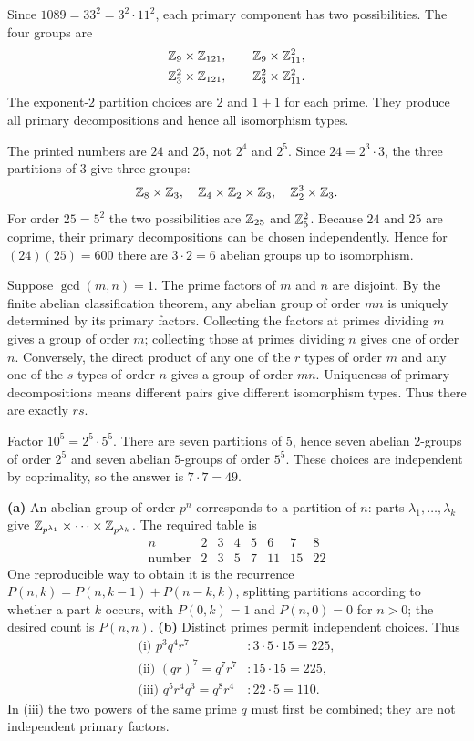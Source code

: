 Since $1089=33^2=3^2\cdot11^2$, each primary component has two possibilities. The four groups are
\[\begin{gathered}
\mathbb{Z}_9\times\mathbb{Z}_{121},\qquad\mathbb{Z}_9\times\mathbb{Z}_{11}^2,\\
\mathbb{Z}_3^2\times\mathbb{Z}_{121},\qquad\mathbb{Z}_3^2\times\mathbb{Z}_{11}^2.
\end{gathered}\]
The exponent-$2$ partition choices are $2$ and $1+1$ for each prime. They produce all primary decompositions and hence all isomorphism types.

The printed numbers are $24$ and $25$, not $2^4$ and $2^5$. Since $24=2^3\cdot3$, the three partitions of $3$ give three groups:
\[\mathbb{Z}_8\times\mathbb{Z}_3,\quad\mathbb{Z}_4\times\mathbb{Z}_2\times\mathbb{Z}_3,\quad\mathbb{Z}_2^3\times\mathbb{Z}_3.\]
For order $25=5^2$ the two possibilities are $\mathbb{Z}_{25}$ and $\mathbb{Z}_5^2$. Because $24$ and $25$ are coprime, their primary decompositions can be chosen independently. Hence for $(24)(25)=600$ there are $3\cdot2=6$ abelian groups up to isomorphism.

Suppose $\gcd(m,n)=1$. The prime factors of $m$ and $n$ are disjoint. By the finite abelian classification theorem, any abelian group of order $mn$ is uniquely determined by its primary factors. Collecting the factors at primes dividing $m$ gives a group of order $m$; collecting those at primes dividing $n$ gives one of order $n$. Conversely, the direct product of any one of the $r$ types of order $m$ and any one of the $s$ types of order $n$ gives a group of order $mn$. Uniqueness of primary decompositions means different pairs give different isomorphism types. Thus there are exactly $rs$.

Factor $10^5=2^5\cdot5^5$. There are seven partitions of $5$, hence seven abelian $2$-groups of order $2^5$ and seven abelian $5$-groups of order $5^5$. These choices are independent by coprimality, so the answer is $7\cdot7=49$.

\textbf{(a)} An abelian group of order $p^n$ corresponds to a partition of $n$: parts $\lambda_1,\ldots,\lambda_k$ give $\mathbb{Z}_{p^{\lambda_1}}\times\cdots\times\mathbb{Z}_{p^{\lambda_k}}$. The required table is
\[\begin{array}{c|rrrrrrr}n&2&3&4&5&6&7&8\\\hline\text{number}&2&3&5&7&11&15&22\end{array}\]
One reproducible way to obtain it is the recurrence $P(n,k)=P(n,k-1)+P(n-k,k)$, splitting partitions according to whether a part $k$ occurs, with $P(0,k)=1$ and $P(n,0)=0$ for $n>0$; the desired count is $P(n,n)$.
\textbf{(b)} Distinct primes permit independent choices. Thus
\[\begin{aligned}
\text{(i) }p^3q^4r^7 &: 3\cdot5\cdot15=225,\\
\text{(ii) }(qr)^7=q^7r^7 &:15\cdot15=225,\\
\text{(iii) }q^5r^4q^3=q^8r^4 &:22\cdot5=110.
\end{aligned}\]
In (iii) the two powers of the same prime $q$ must first be combined; they are not independent primary factors.

